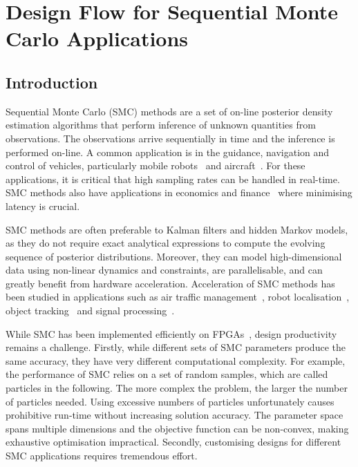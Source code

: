
\chapter[Design Flow for SMC Applications]{Design Flow for Sequential Monte Carlo Applications}

\label{ch:flow}

\section{Introduction}
\label{sec:intro}

Sequential Monte Carlo (SMC) methods are a set of on-line posterior density estimation algorithms that perform inference of unknown quantities from observations.
The observations arrive sequentially in time and the inference is performed on-line.
A common application is in the guidance, navigation and control of vehicles, particularly mobile robots~\cite{montemerlo02} and aircraft~\cite{kantas09}.
For these applications, it is critical that high sampling rates can be handled in real-time.
SMC methods also have applications in economics and finance~\cite{creal12} where minimising latency is crucial.
 
SMC methods are often preferable to Kalman filters and hidden Markov models, as they do not require exact analytical expressions to compute the evolving sequence of posterior distributions.
Moreover, they can model high-dimensional data using non-linear dynamics and constraints, are parallelisable, and can greatly benefit from hardware acceleration.
Acceleration of SMC methods has been studied in applications such as air traffic management~\cite{chau13b,eele13}, robot localisation~\cite{chau13a}, object tracking~\cite{happe13} and signal processing~\cite{hendeby07}.

While SMC has been implemented efficiently on FPGAs~\cite{chau13a,chau13b,happe13,hendeby07}, design productivity remains a challenge.
Firstly, while different sets of SMC parameters produce the same accuracy, they have very different computational complexity.
For example, the performance of SMC relies on a set of random samples, which are called particles in the following.
The more complex the problem, the larger the number of particles needed.
Using excessive numbers of particles unfortunately causes prohibitive run-time without increasing solution accuracy.
The parameter space spans multiple dimensions and the objective function can be non-convex, making exhaustive optimisation impractical.
Secondly, customising designs for different SMC applications requires tremendous effort.

